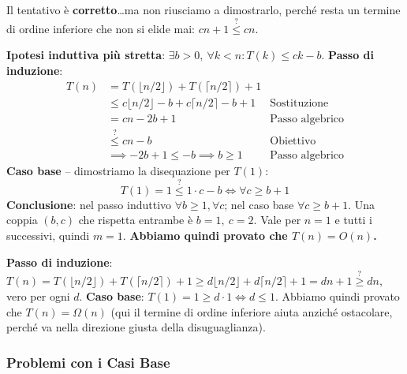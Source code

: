 \documentclass[12pt, a4paper]{article}
\begin{document}
\begin{tcolorbox}[colback=lightergray!5, colframe=tocsubsec, title=\textbf{Cosa Succede?}]
Il tentativo è \textbf{corretto}\ldots ma non riusciamo a dimostrarlo, perché resta un termine di ordine inferiore che non si elide mai: $cn+1 \overset{?}{\le} cn$.
\end{tcolorbox}

\begin{tcolorbox}[colback=lightergray!10, colframe=tocsec, title=\textbf{La Soluzione: un'Ipotesi Induttiva più Stretta}]
\label{prop:ipotesi-piu-stretta}
\textbf{Ipotesi induttiva più stretta}: $\exists b>0,\ \forall k<n: T(k)\le ck-b$. \textbf{Passo di induzione}:
\begin{align*}
T(n) &= T(\lfloor n/2\rfloor)+T(\lceil n/2\rceil)+1 \\
     &\le c\lfloor n/2\rfloor - b + c\lceil n/2\rceil - b + 1 & \text{Sostituzione} \\
     &= cn-2b+1 & \text{Passo algebrico} \\
     &\overset{?}{\le} cn-b & \text{Obiettivo} \\
     &\implies -2b+1\le -b \implies b\ge 1 & \text{Passo algebrico}
\end{align*}
\textbf{Caso base} -- dimostriamo la disequazione per $T(1)$:
$$T(1)=1 \overset{?}{\le} 1\cdot c-b \iff \forall c\ge b+1$$
\textbf{Conclusione}: nel passo induttivo $\forall b\ge 1,\forall c$; nel caso base $\forall c\ge b+1$. Una coppia $(b,c)$ che rispetta entrambe è $b=1,\ c=2$. Vale per $n=1$ e tutti i successivi, quindi $m=1$. \textbf{Abbiamo quindi provato che $T(n)=O(n)$.}
\end{tcolorbox}

\begin{tcolorbox}[colback=lightergray!5, colframe=tocsubsec, title=\textbf{Limite Inferiore -- Nessuna Difficoltà}]
\textbf{Passo di induzione}: $T(n) = T(\lfloor n/2\rfloor)+T(\lceil n/2\rceil)+1 \ge d\lfloor n/2\rfloor+d\lceil n/2\rceil+1 = dn+1 \overset{?}{\ge} dn$, vero per ogni $d$. \textbf{Caso base}: $T(1)=1\ge d\cdot 1 \iff d\le 1$. Abbiamo quindi provato che $T(n)=\Omega(n)$ (qui il termine di ordine inferiore aiuta anziché ostacolare, perché va nella direzione giusta della disuguaglianza).
\end{tcolorbox}

\subsubsection{Problemi con i Casi Base}
\end{document}
